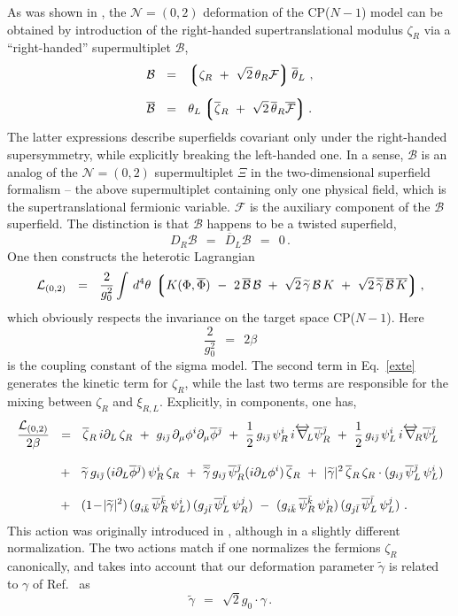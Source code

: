 \documentclass[12pt]{article}
\def\beq{\begin{equation}}
\def\eeq{\end{equation}}
\newcommand{\ntwoo}{${\mathcal N}= \left(0,2\right) $ }
\newcommand{\p}{\partial}
\newcommand{\wt}{\widetilde}
\newcommand{\ov}{\overline}
\newcommand{\mc}[1]{\mathcal{#1}}
\newcommand{\lgr}{\left\lgroup}
\newcommand{\rgr}{\right\rgroup}
\newcommand{\bzr}{\ov{\zeta}{}_R}
\newcommand{\zr}{\zeta_R}
\newcommand{\tgamma}{\wt{\gamma}}
\newcommand{\bj}{{\bar \jmath}}
\newcommand{\bk}{{\bar k}}
\newcommand{\bl}{{\bar l}}
\begin{document}
	As was shown in \cite{SYhet},  the \ntwoo deformation of the CP($N-1$) model can be obtained by
	introduction of the right-handed supertranslational modulus $ \zeta_R $ via a ``right-handed'' 
	supermultiplet $ \mc{B} $,
\begin{align*}
%
	\mc{B} & ~~=~~ \lgr \zr ~+~ \sqrt{2}\,\theta_R\mc{F} \rgr \ov{\theta}{}_L~, \\[2mm]
%
	\ov{\mc{B}} & ~~=~~ \theta_L \lgr \bzr ~+~ \sqrt{2}\, \ov{\theta}{}_R \ov{\mc{F}} \rgr.
\end{align*}
	The latter expressions describe superfields covariant only under the right-handed supersymmetry, 
	while explicitly breaking the left-handed one.
	In a sense, $ \mc{B} $ is an analog of the \ntwoo supermultiplet $\Xi$ in the two-dimensional 
	superfield formalism \cite{Edalati} --
	the above supermultiplet containing only one physical field, which is the supertranslational
	fermionic variable. ${\mathcal F}$ is the auxiliary component of the $\mc{B}$ superfield.
	The distinction is that $ \mc{B} $ happens to be a twisted superfield,
\[
	D_R \mc{B} ~~=~~ \ov{D}_L\mc{B} ~~=~~ 0\,.
\]
One then constructs the heterotic Lagrangian
\beq
\label{exte}
	\mc{L}_{(0,2)} ~~=~~ \frac{2}{g_0^2} \int\, d^4\theta\, \lgr K(\Phi,\ov{\Phi}) 
		~-~ 2\, \ov{\mc{B}}\,\mc{B}  
		~+~  \sqrt{2}\, \tgamma\,\mc{B}\,K  ~+~ \sqrt{2}\, \ov{\tgamma}\,\ov{\mc{B}}\,\ov{K} \rgr,
\eeq
	which obviously respects the invariance on the target space CP($N-1$).
	Here
\[	
	\frac{2}{g_0^2} ~~=~~ 2 \beta
\]
	is the coupling constant of the sigma model.
	The second term in Eq.~\eqref{exte} generates the kinetic term for $ \zr $, while the last two terms 
	are responsible for the mixing between $ \zr $ and $ \xi_{R,L} $.
	Explicitly, in components, one has,
\begin{align}
%
\notag
	\frac{\mc{L}_{(0,2)}}{2\beta} & ~~=~~  \bzr\, i\p_L\, \zr 
			~+~ g_{i\bj}\,\p_\mu \phi^i \p_\mu\ov{\phi}{}^\bj
			~+~ \frac{1}{2}\, g_{i\bj}\, \psi^i_R\, i\overleftrightarrow{\nabla}{}_{\!\!L} \ov{\psi}{}^\bj_R 
			~+~ \frac{1}{2}\, g_{i\bj}\, \psi^i_L\, i\overleftrightarrow{\nabla}{}_{\!\!R} \ov{\psi}{}^\bj_L 
	\\[3mm]
%
\label{cpn-1g}
			& 
			~~+~~ \tgamma\, g_{i\bj}\, (i \p_L \ov{\phi}{}^\bj)\, \psi_R^i\, \zr
			~+~ \ov{\tgamma}\, g_{i\bj}\, \ov{\psi}{}_R^\bj (i \p_L \phi^i)\, \bzr
			~+~ |\tgamma|^2\, \bzr\,\zr \cdot ( g_{i\bj}\, \ov{\psi}{}_L^\bj\, \psi_L^i )
	\\[3mm]
%
\notag
			& 
			~~+~~ (1 \!-\! |\tgamma|^2)\, (g_{i\bk}\, \ov{\psi}{}_R^\bk\, \psi_L^i)\,
						     (g_{j\bl}\, \ov{\psi}{}_L^\bl\, \psi_R^j)
			~-~ (g_{i\bk}\, \ov{\psi}{}_R^\bk\, \psi_R^i)\, (g_{j\bl}\, \ov{\psi}{}_L^\bl\, \psi_L^j)~.
\end{align}
	This action was originally introduced in \cite{SYhet}, although in a slightly different
	normalization.
	The two actions match if one normalizes the fermions $ \zr $ canonically, and
	takes into account that our deformation parameter $ \tgamma $ is related to $ \gamma $ 
	of Ref.~\cite{SYhet} as
\[
	\tgamma ~~=~~ \sqrt{2} g_0\cdot \gamma\,.
\]
	
\end{document}
